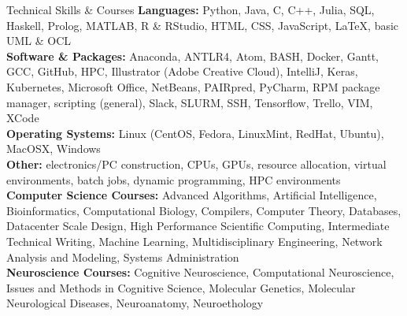\documentclass{resume} %
\begin{document}
\iftrue
\begin{rSection}{Technical Skills \& Courses }
\vspace{.2cm}
\textbf{Languages:} Python, Java, C, C++, Julia, SQL, Haskell, Prolog, MATLAB, R \& RStudio, HTML, CSS, JavaScript, \LaTeX, basic UML \& OCL \vspace{.2cm} \\
\textbf{Software \& Packages:} Anaconda, ANTLR4, Atom, BASH, Docker, Gantt, GCC, GitHub, HPC, Illustrator (Adobe Creative Cloud), IntelliJ, Keras, Kubernetes, Microsoft Office, NetBeans, PAIRpred, PyCharm, RPM package manager, scripting (general), Slack, SLURM, SSH, Tensorflow, Trello, VIM, XCode\vspace{.2cm}\\
\textbf{Operating Systems:} Linux (CentOS, Fedora, LinuxMint, RedHat, Ubuntu), MacOSX, Windows\vspace{.2cm}\\
\textbf{Other:} electronics/PC construction, CPUs, GPUs, resource allocation, virtual environments, batch jobs, dynamic programming, HPC environments \vspace{.2cm}\\
\textbf{Computer Science Courses:} Advanced Algorithms, Artificial Intelligence, Bioinformatics, Computational Biology, Compilers, Computer Theory, Databases, Datacenter Scale Design, High Performance Scientific Computing, Intermediate Technical Writing, Machine Learning,  Multidisciplinary Engineering, Network Analysis and Modeling, Systems Administration\vspace{.2cm}\\
\textbf{Neuroscience Courses:} Cognitive Neuroscience, Computational Neuroscience, Issues and Methods in Cognitive Science, Molecular Genetics, Molecular Neurological Diseases, Neuroanatomy, Neuroethology

\end{rSection}
\fi
\newpage
\end{document}
